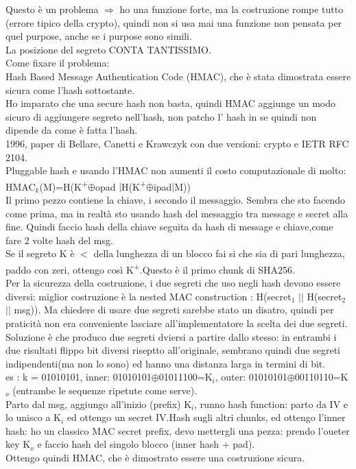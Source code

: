 \documentclass[16px]{article}
\begin{document}
Questo è un problema $\Rightarrow$ ho una funzione forte, ma la costruzione rompe tutto (errore tipico della crypto), quindi non si usa mai una funzione non pensata per quel purpose, anche se i purpose sono simili.\\
La posizione del segreto CONTA TANTISSIMO.\\
Come fixare il problema:\\
Hash Based Message Authentication Code (HMAC), che è stata dimostrata essere sicura come l'hash sottostante.\\
Ho imparato che una secure hash non basta, quindi HMAC aggiunge un modo sicuro di aggiungere segreto nell'hash, non patcho l' hash in se quindi non dipende da come è fatta l'hash.\\
1996, paper di Bellare, Canetti e Krawczyk con due versioni: crypto e IETR RFC 2104.\\
Pluggable hash e usando l'HMAC non aumenti il costo computazionale di molto:\\
HMAC$_{k}$(M)=H(K\textsuperscript{+}$\oplus$opad $|$H(K\textsuperscript{+}$\oplus$ipad$|$M))\\
Il primo pezzo contiene la chiave, i secondo il messaggio. Sembra che sto facendo come prima, ma in realtà sto usando hash del messaggio tra message e secret alla fine. Quindi faccio hash della chiave seguita da hash di message e chiave,come fare 2 volte hash del msg.\\
Se il segreto K è $<$ della lunghezza di un blocco fai si che sia di pari lunghezza, paddo con zeri, ottengo così K\textsuperscript{+}.Questo è il primo chunk di SHA256.\\Per la sicurezza della costruzione, i due segreti che uso negli hash devono essere diversi: miglior costruzione è la nested MAC construction : H(secret$_{1}$ $||$ H(secret$_{2}$ $||$ msg)). Ma chiedere di usare due segreti sarebbe stato un disatro, quindi per praticità non era conveniente lasciare all'implementatore la scelta dei due segreti.\\Soluzione è che produco due segreti dviersi a partire dallo stesso: in entrambi i due risultati flippo bit diversi riseptto all'originale, sembrano quindi due segreti indipendenti(ma non lo sono) ed hanno una distanza larga in termini di bit.\\
es : k = 01010101, inner: 01010101$\oplus$01011100=K$_{i}$, outer: 01010101$\oplus$00110110=K$_{o}$ (entrambe le sequenze ripetute come serve).\\
Parto dal msg, aggiungo all'inizio (prefix) K$_{i}$, runno hash function: parto da IV e lo unisco a K$_{i}$ ed ottengo un secret IV.Hash sugli altri chunks, ed ottengo l'inner hash: ho un classico MAC secret prefix, devo mettergli una pezza: prendo l'oueter key K$_{o}$ e faccio hash del singolo blocco (inner hash + pad).\\Ottengo quindi HMAC, che è dimostrato essere una costruzione sicura.\\
\end{document}
